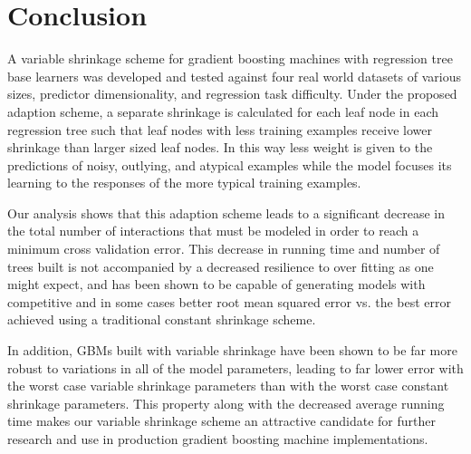 \documentclass[9pt, conference]{IEEEtran}
\begin{document}
\section{Conclusion}

A variable shrinkage scheme for gradient boosting machines with regression tree base learners was developed and tested against four real world datasets of various sizes, predictor dimensionality, and regression task difficulty. Under the proposed adaption scheme, a separate shrinkage is calculated for each leaf node in each regression tree such that leaf nodes with less training examples receive lower shrinkage than larger sized leaf nodes. In this way less weight is given to the predictions of noisy, outlying, and atypical examples while the model focuses its learning to the responses of the more typical training examples. 

Our analysis shows that this adaption scheme leads to a significant decrease in the total number of interactions that must be modeled in order to reach a minimum cross validation error. This decrease in running time and number of trees built is not accompanied by a decreased resilience to over fitting as one might expect, and has been shown to be capable of generating models with competitive and in some cases better root mean squared error vs. the best error achieved using a traditional constant shrinkage scheme.  

In addition, GBMs built with variable shrinkage have been shown to be far more robust to variations in all of the model parameters, leading to far lower error with the worst case variable shrinkage parameters than with the worst case constant shrinkage parameters. This property along with the decreased average running time makes our variable shrinkage scheme an attractive candidate for further research and use in production gradient boosting machine implementations.





	

\end{document}
